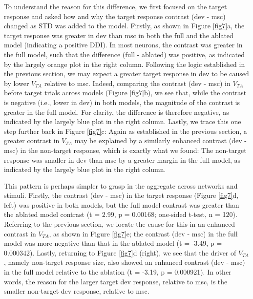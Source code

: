 \documentclass[pdflatex,referee,iicol,sn-basic]{sn-jnl}
\theoremstyle{thmstyleone}%
\theoremstyle{thmstyletwo}%
\theoremstyle{thmstylethree}%
\begin{document}
To understand the reason for this difference, we first focused on the target response and asked how and why the target response contrast (dev - msc) changed as STD was added to the model. Firstly, as shown in Figure \ref{fig7}a, the target response was greater in dev than msc in both the full and the ablated model (indicating a positive DDI). In most neurons, the contrast was greater in the full model, such that the difference (full - ablated) was positive, as indicated by the largely orange plot in the right column.
Following the logic established in the previous section, we may expect a greater target response in dev to be caused by lower $V_{TA}$ relative to msc. Indeed, comparing the contrast (dev - msc) in $V_{TA}$ before target trials across models (Figure \ref{fig7}b), we see that, while the contrast is negative (i.e., lower in dev) in both models, the magnitude of the contrast is greater in the full model. For clarity, the difference is therefore negative, as indicated by the largely blue plot in the right column.
Lastly, we trace this one step further back in Figure \ref{fig7}c: Again as established in the previous section, a greater contrast in $V_{TA}$ may be explained by a similarly enhanced contrast (dev - msc) in the non-target response, which is exactly what we found: The non-target response was smaller in dev than msc by a greater margin in the full model, as indicated by the largely blue plot in the right column.

This pattern is perhaps simpler to grasp in the aggregate across networks and stimuli. Firstly, the contrast (dev - msc) in the target response (Figure \ref{fig7}d, left) was positive in both models, but the full model contrast was greater than the ablated model contrast (t = 2.99, p = 0.00168; one-sided t-test, n = 120). Referring to the previous section, we locate the cause for this in an enhanced contrast in $V_{TA}$, as shown in Figure \ref{fig7}e; the contrast (dev - msc) in the full model was more negative than that in the ablated model (t = -3.49, p = 0.000342). Lastly, returning to Figure \ref{fig7}d (right), we see that the driver of $V_{TA}$, namely non-target response size, also showed an enhanced contrast (dev - msc) in the full model relative to the ablation (t = -3.19, p = 0.000921). In other words, the reason for the larger target dev response, relative to msc, is the smaller non-target dev response, relative to msc.
\end{document}
